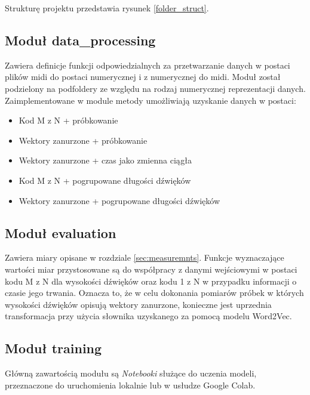 {{        Strukturę projektu przedstawia rysunek \ref{folder_struct}.

        

        \subsection{Moduł data\_processing}
        {
            Zawiera definicje funkcji odpowiedzialnych za przetwarzanie danych w postaci plików midi do postaci numerycznej i z numerycznej do midi. Moduł został podzielony na podfoldery ze względu na rodzaj numerycznej reprezentacji danych. Zaimplementowane w module metody umożliwiają uzyskanie danych w postaci:
            \begin{itemize}
                \setlength\itemsep{-0.5em}
                \item Kod  M\,\,z\,\,N + próbkowanie
                \item Wektory zanurzone + próbkowanie
                \item Wektory zanurzone + czas jako zmienna ciągła
                \item Kod  M\,\,z\,\,N + pogrupowane długości dźwięków
                \item Wektory zanurzone + pogrupowane długości dźwięków
            \end{itemize}


        }

        \subsection{Moduł evaluation}
        {
            Zawiera miary opisane w rozdziale \ref{sec:measuremnts}. Funkcje wyznaczające wartości miar przystosowane są do współpracy z danymi wejściowymi w postaci kodu M\,\,z\,\,N dla wysokości dźwięków oraz kodu 1\,\,z\,\,N w przypadku informacji o czasie jego trwania. Oznacza to, że w celu dokonania pomiarów próbek w których wysokości dźwięków opisują wektory zanurzone, konieczne jest uprzednia transformacja przy użycia słownika uzyskanego za pomocą modelu Word2Vec.
        }

        \subsection{Moduł training}
        {
            Główną zawartością modułu są {\textit {Notebooki}} służące do uczenia modeli, przeznaczone do uruchomienia lokalnie lub w usłudze Google Colab. 
        }

}}
